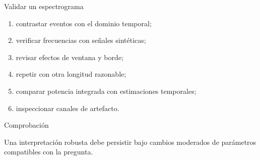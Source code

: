 \documentclass[
  10pt,
  ignorenonframetext,
  aspectratio=169,
  spanish,
]{beamer}
\providecommand{\tightlist}{%
  \setlength{\itemsep}{0pt}\setlength{\parskip}{0pt}}
\begin{document}
\begin{frame}{Validar un espectrograma}
\label{d2-127}
\begin{enumerate}
\tightlist
\item
  contrastar eventos con el dominio temporal;
\item
  verificar frecuencias con señales sintéticas;
\item
  revisar efectos de ventana y borde;
\item
  repetir con otra longitud razonable;
\item
  comparar potencia integrada con estimaciones temporales;
\item
  inspeccionar canales de artefacto.
\end{enumerate}

\begin{block}{Comprobación}

Una interpretación robusta debe persistir bajo cambios moderados de
parámetros compatibles con la pregunta.

\end{block}

\end{frame}
\end{document}
